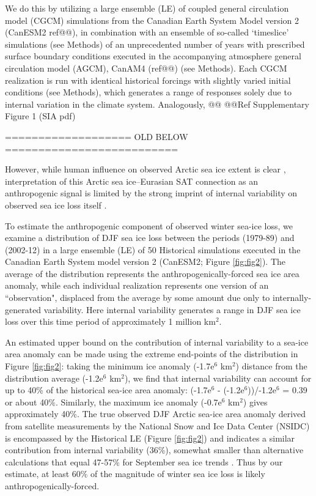 \documentclass{nature}
\begin{document}
We do this by utilizing a large ensemble (LE) of coupled general circulation model (CGCM) simulations from the Canadian Earth System Model version 2 (CanESM2 ref@@), in combination with an ensemble of so-called `timeslice' simulations (see Methods) of an unprecedented number of years with prescribed surface boundary conditions executed in the accompanying atmosphere general circulation model (AGCM), CanAM4 (ref@@) (see Methods). Each CGCM realization is run with identical historical forcings with slightly varied initial conditions (see Methods), which generates a range of responses solely due to internal variation in the climate system. Analogously, @@
@@Ref Supplementary Figure 1 (SIA pdf)

 
 
 
 =================== OLD BELOW ==========================
 
 However, while human influence on observed Arctic sea ice extent is clear \cite{min08}, interpretation of this Arctic sea ice--Eurasian SAT connection as an anthropogenic signal is limited by the strong imprint of internal variability on observed sea ice loss itself \cite{swart15}. 

To estimate the anthropogenic component of observed winter sea-ice loss, we examine a distribution of DJF sea ice loss between the periods (1979-89) and (2002-12) in a large ensemble (LE) of 50 Historical simulations executed in the Canadian Earth System model version 2 (CanESM2; Figure \ref{fig:fig2}). The average of the distribution represents the anthropogenically-forced sea ice area anomaly, while each individual realization represents one version of an ``observation", displaced from the average by some amount due only to internally-generated variability. Here internal variability generates a range in DJF sea ice loss over this time period of approximately 1 million km$^2$. 

An estimated upper bound on the contribution of internal variability to a sea-ice area anomaly can be made using the extreme end-points of the distribution in Figure \ref{fig:fig2}: taking the minimum ice anomaly (-1.7e$^6$ km$^2$) distance from the distribution average (-1.2e$^6$ km$^2$), we find that internal variability can account for up to 40\% of the historical sea-ice area anomaly: (-1.7e$^6$ - (-1.2e$^6$))/-1.2e$^6$ = 0.39 or about 40\%. Similarly, the maximum ice anomaly (-0.7e$^6$ km$^2$) gives approximately 40\%. The true observed DJF Arctic sea-ice area anomaly derived from satellite measurements by the National Snow and Ice Data Center (NSIDC) is encompassed by the Historical LE (Figure \ref{fig:fig2}) and indicates a similar contribution from internal variability (36\%), somewhat smaller than alternative calculations that equal 47-57\% for September sea ice trends \cite{kay11,stroeve07}. Thus by our estimate, at least 60\% of the magnitude of winter sea ice loss is likely anthropogenically-forced. 
\end{document}
